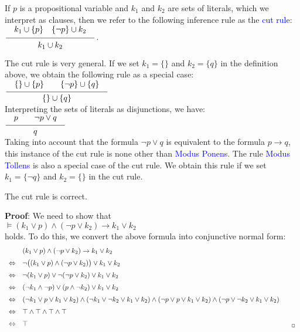 \begin{Definition}
    If $p$ is a propositional variable and $k_1$ and $k_2$ are sets of literals,
    which we interpret as clauses, then we refer to the following inference rule
    as the \textcolor{blue}{cut rule}: 
    \\[0.2cm]
    \hspace*{1.3cm}
    $\ds \schluss{ k_1 \cup \{p\} \quad \{\neg p\} \cup k_2 }{k_1 \cup k_2}$. 
    \eox
\end{Definition}

The cut rule is very general. If we set $k_1 = \{\}$ and $k_2 = \{q\}$ in the definition above,
we obtain the following rule as a special case: \\[0.2cm]
\hspace*{1.3cm} $\schluss{\{\} \cup \{p\} \quad\quad \{\neg p\} \cup \{ q \} }{ \{\} \cup \{q\} }$ \\[0.2cm]
Interpreting the sets of literals as disjunctions, we have: \\[0.2cm]
\hspace*{1.3cm}  $\schluss{p \quad\quad \neg p \vee q }{ q }$ \\[0.2cm]
Taking into account that the formula $\neg p \vee q$ is equivalent to the
formula $p \rightarrow q$, this instance of the cut rule is none other than \textcolor{blue}{Modus Ponens}.
The rule \textcolor{blue}{Modus Tollens} is also a special case of the cut rule. We
obtain this rule if we set $k_1 = \{ \neg q \}$ and $k_2 = \{\}$ in the cut rule.

\begin{Theorem}
  The cut rule is correct.
\end{Theorem}
\textbf{Proof}: We need to show that
\\[0.2cm]
\hspace*{1.3cm}
$\models (k_1 \vee p) \wedge (\neg p \vee k_2) \rightarrow k_1 \vee k_2$
\\[0.2cm]
holds. To do this, we convert the above formula into conjunctive normal form:
$$
\begin{array}{ll}
  & (k_1 \vee p) \wedge (\neg p \vee k_2) \rightarrow k_1 \vee k_2  \\[0.2cm]
\Leftrightarrow  & 
    \neg \bigl( (k_1 \vee p) \wedge (\neg p \vee k_2) \bigr) \vee k_1 \vee k_2 \\[0.2cm]
\Leftrightarrow  & 
    \neg (k_1 \vee p) \vee \neg (\neg p \vee k_2) \vee k_1 \vee k_2 \\[0.2cm]
\Leftrightarrow  & 
     (\neg k_1 \wedge \neg p) \vee  (p \wedge \neg k_2) \vee k_1 \vee k_2 \\[0.2cm]
\Leftrightarrow  & 
     (\neg k_1 \vee p \vee k_1 \vee k_2)  \wedge 
     (\neg k_1 \vee \neg k_2 \vee k_1 \vee k_2)  \wedge 
     (\neg p \vee p \vee k_1 \vee k_2)  \wedge 
     (\neg p \vee \neg k_2 \vee k_1 \vee k_2) 
      \\[0.2cm]
\Leftrightarrow  & 
     \verum  \wedge 
     \verum  \wedge 
     \verum  \wedge 
     \verum 
      \\[0.2cm]
\Leftrightarrow  & 
     \verum    \hspace*{13.5cm} _\Box
      \\
\end{array}
$$


